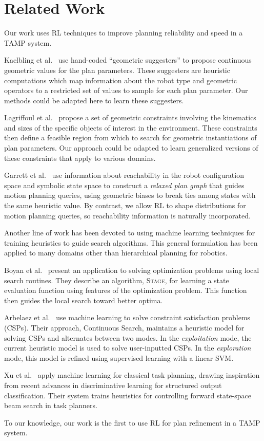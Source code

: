 \section{Related Work}
Our work uses RL techniques to improve planning reliability and speed in a TAMP system.

Kaelbling et al.~\cite{kaelbling2011hierarchical} use hand-coded ``geometric suggesters'' to propose
continuous geometric values for the plan parameters. These suggesters are heuristic
computations which map information about the robot type and geometric operators to a restricted
set of values to sample for each plan parameter. Our methods could be adapted here to learn these
suggesters.

Lagriffoul et al.~\cite{lagriffoul2014orientation}
propose a set of geometric constraints involving the kinematics and sizes of the specific objects of
interest in the environment. These constraints then define a feasible region from which to search
for geometric instantiations of plan parameters. Our approach could be adapted to learn generalized
versions of these constraints that apply to various domains.

Garrett et al.~\cite{GarrettWAFR14} use information about reachability in the robot configuration
space and symbolic state space to construct a \emph{relaxed plan graph} that guides motion
planning queries, using geometric biases to break ties among states with the same heuristic value.
By contrast, we allow RL to shape distributions for motion planning queries, so reachability information
is naturally incorporated.

Another line of work has been devoted to using machine learning techniques for
training heuristics to guide search algorithms. This general formulation
has been applied to many domains other than hierarchical planning for robotics.

Boyan et al.~\cite{Boyanlearning} present an application to solving optimization
problems using local search routines. They describe an algorithm, \textsc{Stage},
for learning a state evaluation function using features of the optimization problem.
This function then guides the local search toward better optima.

Arbelaez et al.~\cite{hamadisearch} use machine learning to solve constraint
satisfaction problems (CSPs). Their approach, Continuous Search, maintains a heuristic
model for solving CSPs and alternates between two modes. In the \emph{exploitation} mode,
the current heuristic model is used to solve user-inputted CSPs. In the \emph{exploration}
mode, this model is refined using supervised learning with a linear SVM.

Xu et al.~\cite{Xu07discriminativelearning} apply machine learning for classical task
planning, drawing inspiration from recent advances in discriminative learning for
structured output classification. Their system trains heuristics for controlling forward
state-space beam search in task planners.

To our knowledge, our work is the first to use RL for plan refinement in a TAMP system.
